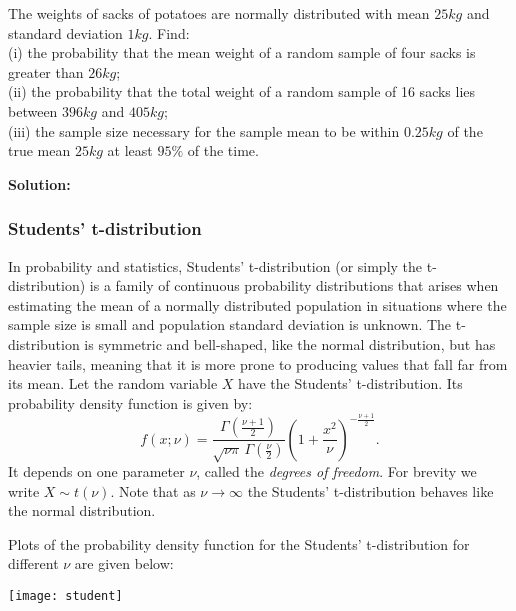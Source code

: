 \documentclass[12pt]{article}
\newenvironment{example}[1][Example:]{\begin{trivlist}
\item[\hskip \labelsep {\bfseries #1}]}{\end{trivlist}}
\begin{document}
\begin{example}
The weights of sacks of potatoes are normally distributed with mean $25kg$ and standard deviation $1kg$. Find:\\
(i) the probability that the mean weight of a random sample of four sacks is greater than $26kg$;\\
(ii) the probability that the total weight of a random sample of 16 sacks lies between $396kg$ and $405kg$;\\
(iii) the sample size necessary for the sample mean to be within $0.25kg$ of the true mean $25kg$ at least $95\%$ of the time.
\end{example}
\begin{mdframed}
{\bf Solution:}
\textcolor[rgb]{1.00,1.00,1.00}{\lipsum[1-6]}
\end{mdframed}


\subsubsection{Students' t-distribution}
In probability and statistics, Students' t-distribution (or simply the t-distribution) is a family of continuous probability distributions that arises when estimating the mean of a normally distributed population in situations where the sample size is small and population standard deviation is unknown. The t-distribution is symmetric and bell-shaped, like the normal distribution, but has heavier tails, meaning that it is more prone to producing values that fall far from its mean. Let the random variable $X$ have the Students' t-distribution. Its probability density function is given by:
$$f(x;\nu) = \frac{\Gamma(\frac{\nu+1}{2})} {\sqrt{\nu\pi}\,\Gamma(\frac{\nu}{2})} \left(1+\frac{x^2}{\nu} \right)^{-\frac{\nu+1}{2}}.$$
It depends on one parameter $\nu$, called the \emph{degrees of freedom}. For brevity we write $X \sim t(\nu)$.
Note that as $\nu \rightarrow \infty$ the Students' t-distribution behaves like the normal distribution.

Plots of the probability density function for the Students' t-distribution for different $\nu$ are given below:

\begin{center}
  \texttt{[image: student]}
\end{center}
\end{document}
